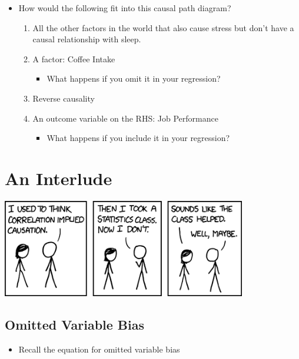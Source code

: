 \documentclass[
]{book}
\providecommand{\tightlist}{%
  \setlength{\itemsep}{0pt}\setlength{\parskip}{0pt}}
\theoremstyle{definition}
\theoremstyle{definition}
\theoremstyle{definition}
\theoremstyle{definition}
\theoremstyle{remark}
\begin{document}
\begin{itemize}
\tightlist
\item
  How would the following fit into this causal path diagram?

  \begin{enumerate}
  \def\labelenumi{\arabic{enumi}.}
  \tightlist
  \item
    All the other factors in the world that also cause stress but don't have a causal relationship with sleep.
  \item
    A factor: Coffee Intake

    \begin{itemize}
    \tightlist
    \item
      What happens if you omit it in your regression?
    \end{itemize}
  \item
    Reverse causality
  \item
    An outcome variable on the RHS: Job Performance

    \begin{itemize}
    \tightlist
    \item
      What happens if you include it in your regression?
    \end{itemize}
  \end{enumerate}
\end{itemize}

\hypertarget{an-interlude}{%
\section{An Interlude}\label{an-interlude}}

\includegraphics[width=0.8\textwidth,height=\textheight]{./images/correlation.png}

\hypertarget{omitted-variable-bias}{%
\subsection{Omitted Variable Bias}\label{omitted-variable-bias}}

\begin{itemize}
\tightlist
\item
  Recall the equation for omitted variable bias
\end{itemize}
\end{document}
